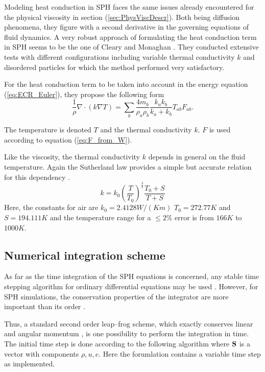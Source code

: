 \documentclass{report}
\begin{document}
Modeling heat conduction in SPH faces the same issues already encountered for the physical viscosity  in section (\ref{sec:PhysViscDescr}). Both being diffusion phenomena, they figure with a second derivative in the governing equations of fluid dynamics. 
A very robust approach of formulating the heat conduction term in SPH seems to be the one of Cleary and Monaghan \cite{Cleary1999}. They conducted extensive tests with different configurations including variable thermal conductivity $k$ and disordered particles for which the method performed very satisfactory.

For the heat conduction term to be taken into account in the energy equation (\ref{eq:ECR_Euler}), they propose the following form
\begin{equation}
 \label{eq:heatConductionTerm}
\frac{1}{\rho}\nabla \cdot (k \nabla T)=\sum_b\frac{4 m_b}{\rho_a \rho_b} \frac{k_a k_b}{k_a + k_b} T_{ab} F_{ab}.
\end{equation}

The temperature is denoted $T$ and the thermal conductivity $k$. $F$ is used according to equation (\ref{eq:F_from_W}). 

Like the viscosity, the thermal conductivity $k$ depends in general on the fluid temperature. Again the Sutherland law provides a simple but accurate relation for this dependency \cite{White1974}.
\begin{equation}
k=k_0 \left(\frac{T}{T_0}\right)^{\frac{3}{2}}\frac{T_0+S}{T+S}
\end{equation}
Here, the constants for air are $k_0=2.4128W/(K m)$ $T_0=272.77K$ and $S=194.111K$ and the temperature range for a  $\leq2\%$ error is from $166K$ to $1000K$. 



\subsection{Numerical integration scheme}
\label{sec:numIntegr}

As far as the time integration of the SPH equations is concerned, any stable
time stepping algorithm for ordinary differential equations may be
used \cite{Monaghan2005}. However, for SPH simulations, the conservation properties
of the integrator are more important than its
order \cite{Monaghan2005}.

Thus, a standard second order leap--frog scheme, %
 which exactly conserves linear and angular momentum
, is one possibility to perform the integration in
time. The initial time step is done according to the following algorithm where
${\bf S}$ is a vector with components  $\rho,u,e$.
Here the forumlation contains a variable time step as implemented.
\end{document}
